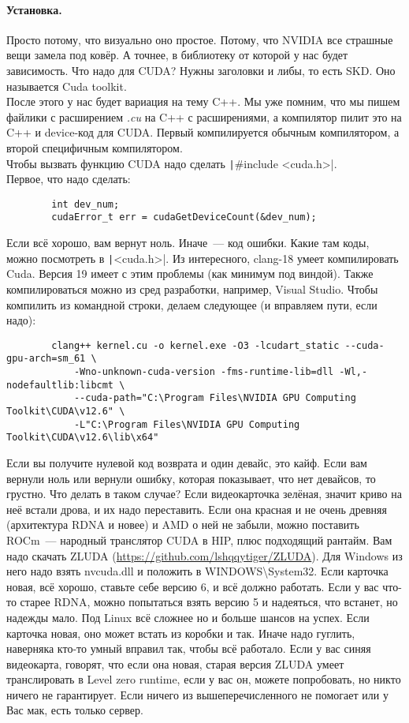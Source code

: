 \documentclass{article}
\begin{document}
    \paragraph{Установка.}
    Просто потому, что визуально оно простое. Потому, что NVIDIA все страшные вещи замела под ковёр. А точнее, в библиотеку от которой у нас будет зависимость. Что надо для CUDA? Нужны заголовки и либы, то есть SKD. Оно называется Cuda toolkit.\\
    После этого у нас будет вариация на тему C++. Мы уже помним, что мы пишем файлики с расширением \textit{.cu} на C++ с расширениями, а компилятор пилит это на C++ и device-код для CUDA. Первый компилируется обычным компилятором, а второй специфичным компилятором.\\
    Чтобы вызвать функцию CUDA надо сделать \texttt|#include <cuda.h>|.\\
    Первое, что надо сделать:
    \begin{verbatim}
        int dev_num;
        cudaError_t err = cudaGetDeviceCount(&dev_num);
    \end{verbatim}
    Если всё хорошо, вам вернут ноль. Иначе~--- код ошибки. Какие там коды, можно посмотреть в \texttt|<cuda.h>|. Из интересного, clang-18 умеет компилировать Cuda. Версия 19 имеет с этим проблемы (как минимум под виндой). Также компилироваться можно из сред разработки, например, Visual Studio. Чтобы компилить из командной строки, делаем следующее (и вправляем пути, если надо):
    \begin{verbatim}
        clang++ kernel.cu -o kernel.exe -O3 -lcudart_static --cuda-gpu-arch=sm_61 \
            -Wno-unknown-cuda-version -fms-runtime-lib=dll -Wl,-nodefaultlib:libcmt \
            --cuda-path="C:\Program Files\NVIDIA GPU Computing Toolkit\CUDA\v12.6" \
            -L"C:\Program Files\NVIDIA GPU Computing Toolkit\CUDA\v12.6\lib\x64"
    \end{verbatim}
    Если вы получите нулевой код возврата и один девайс, это кайф. Если вам вернули ноль или вернули ошибку, которая показывает, что нет девайсов, то грустно. Что делать в таком случае? Если видеокарточка зелёная, значит криво на неё встали дрова, и их надо переставить. Если она красная и не очень древняя (архитектура RDNA и новее) и AMD о ней не забыли, можно поставить ROCm~--- народный транслятор CUDA в HIP, плюс подходящий рантайм. Вам надо скачать ZLUDA (\url{https://github.com/lshqqytiger/ZLUDA}). Для Windows из него надо взять nvcuda.dll и положить в WINDOWS\textbackslash System32. Если карточка новая, всё хорошо, ставьте себе версию 6, и всё должно работать. Если у вас что-то старее RDNA, можно попытаться взять версию 5 и надеяться, что встанет, но надежды мало. Под Linux всё сложнее но и больше шансов на успех. Если карточка новая, оно может встать из коробки и так. Иначе надо гуглить, наверняка кто-то умный вправил так, чтобы всё работало. Если у вас синяя видеокарта, говорят, что если она новая, старая версия ZLUDA умеет транслировать в Level zero runtime, если у вас он, можете попробовать, но никто ничего не гарантирует. Если ничего из вышеперечисленного не помогает или у Вас мак, есть только сервер.
\end{document}
